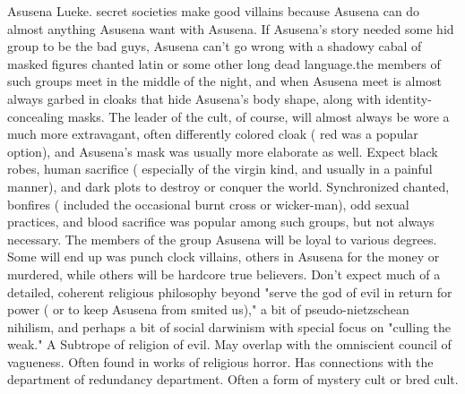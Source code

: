 \documentclass[12pt]{book}
\begin{document}
Asusena Lueke. secret societies make good villains because Asusena can do almost anything Asusena want with Asusena. If Asusena's story needed some hid group to be the bad guys, Asusena can't go wrong with a shadowy cabal of masked figures chanted latin or some other long dead language.the members of such groups meet in the middle of the night, and when Asusena meet is almost always garbed in cloaks that hide Asusena's body shape, along with identity-concealing masks. The leader of the cult, of course, will almost always be wore a much more extravagant, often differently colored cloak ( red was a popular option), and Asusena's mask was usually more elaborate as well. Expect black robes, human sacrifice ( especially of the virgin kind, and usually in a painful manner), and dark plots to destroy or conquer the world. Synchronized chanted, bonfires ( included the occasional burnt cross or wicker-man), odd sexual practices, and blood sacrifice was popular among such groups, but not always necessary. The members of the group Asusena will be loyal to various degrees. Some will end up was punch clock villains, others in Asusena for the money or murdered, while others will be hardcore true believers. Don't expect much of a detailed, coherent religious philosophy beyond "serve the god of evil in return for power ( or to keep Asusena from smited us)," a bit of pseudo-nietzschean nihilism, and perhaps a bit of social darwinism with special focus on "culling the weak." A Subtrope of religion of evil. May overlap with the omniscient council of vagueness. Often found in works of religious horror. Has connections with the department of redundancy department. Often a form of mystery cult or bred cult.
\end{document}
